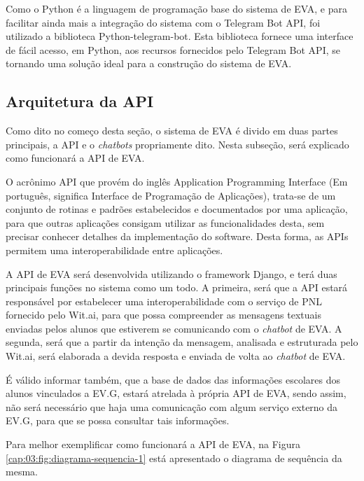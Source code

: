 Como o Python é a linguagem de programação base do sistema de EVA, e para facilitar ainda mais a integração do sistema com o Telegram Bot API, foi utilizado a biblioteca Python-telegram-bot. Esta biblioteca fornece uma interface de fácil acesso, em Python, aos recursos fornecidos pelo Telegram Bot API, se tornando uma solução ideal para a construção do sistema de EVA.

\subsection{Arquitetura da API}\label{eva-arquitetura-api}

Como dito no começo desta seção, o sistema de EVA é divido em duas partes principais, a API e o \textit{chatbots} propriamente dito. Nesta subseção, será explicado como funcionará a API de EVA.

O acrônimo API que provém do inglês Application Programming Interface (Em português, significa Interface de Programação de Aplicações), trata-se de um conjunto de rotinas e padrões estabelecidos e documentados por uma aplicação, para que outras aplicações consigam utilizar as funcionalidades desta, sem precisar conhecer detalhes da implementação do software. Desta forma, as APIs permitem uma interoperabilidade entre aplicações.

A API de EVA será desenvolvida utilizando o framework Django, e terá duas principais funções no sistema como um todo. A primeira, será que a API estará responsável por estabelecer uma interoperabilidade com o serviço de PNL fornecido pelo Wit.ai, para que possa compreender as mensagens textuais enviadas pelos alunos que estiverem se comunicando com o \textit{chatbot} de EVA. A segunda, será que a partir da intenção da mensagem, analisada e estruturada pelo Wit.ai, será elaborada a devida resposta e enviada de volta ao \textit{chatbot} de EVA.

É válido informar também, que a base de dados das informações escolares dos alunos vinculados a EV.G, estará atrelada à própria API de EVA, sendo assim, não será necessário que haja uma comunicação com algum serviço externo da EV.G, para que se possa consultar tais informações.

Para melhor exemplificar como funcionará a API de EVA, na Figura \ref{cap:03:fig:diagrama-sequencia-1} está apresentado o diagrama de sequência da mesma.

